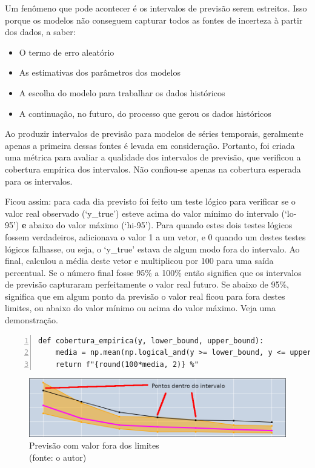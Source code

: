 Um fenômeno que pode acontecer é os intervalos de previsão serem estreitos.\cite{RobHyndman_prediction_intervals} Isso porque os modelos não conseguem capturar todos as fontes de incerteza à partir dos dados, a saber:

\begin{itemize}
	\item O termo de erro aleatório
	\item As estimativas dos parâmetros dos modelos
	\item A escolha do modelo para trabalhar os dados históricos
	\item A continuação, no futuro, do processo que gerou os dados históricos
\end{itemize}

Ao produzir intervalos de previsão para modelos de séries temporais, geralmente apenas a primeira dessas fontes é levada em consideração. Portanto, foi criada uma métrica para avaliar a qualidade dos intervalos de previsão, que verificou a cobertura empírica dos intervalos. Não confiou-se apenas na cobertura esperada para os intervalos.

Ficou assim: para cada dia previsto foi feito um teste lógico para verificar se o valor real observado (`y\_true') esteve acima do valor mínimo do intervalo (`lo-95') \textbf{e} abaixo do valor máximo (`hi-95'). Para quando estes dois testes lógicos fossem verdadeiros, adicionava o valor 1 a um vetor, e 0 quando um destes testes lógicos falhasse, ou seja, o `y\_true' estava de algum modo fora do intervalo. Ao final, calculou a média deste vetor e multiplicou por 100 para uma saída percentual. Se o número final fosse 95\% a 100\% então significa que os intervalos de previsão capturaram perfeitamente o valor real futuro. Se abaixo de 95\%, significa que em algum ponto da previsão o valor real ficou para fora destes limites, ou abaixo do valor mínimo ou acima do valor máximo. Veja uma demonstração.

\begin{Verbatim}[frame=single, numbers=left]
	def cobertura_empirica(y, lower_bound, upper_bound):
	media = np.mean(np.logical_and(y >= lower_bound, y <= upper_bound))
	return f"{round(100*media, 2)} %"
\end{Verbatim}

\begin{figure}[!h]
	\centering
	\includegraphics[scale=0.40]{Figuras/intervalo_previsao_1.png}
	\caption{Previsão com valor fora dos limites\\(fonte: o autor)}
	\label{fig:intervalo_previsao_1}
\end{figure}

